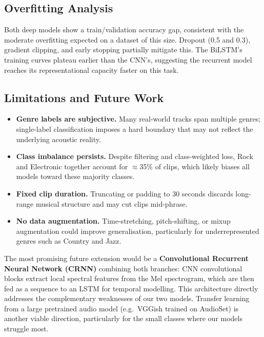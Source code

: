 \documentclass[12pt, a4paper]{article}
\begin{document}
\subsection{Overfitting Analysis}

Both deep models show a train/validation accuracy gap, consistent with the
moderate overfitting expected on a dataset of this size. Dropout (0.5 and 0.3),
gradient clipping, and early stopping partially mitigate this. The BiLSTM's
training curves plateau earlier than the CNN's, suggesting the recurrent model
reaches its representational capacity faster on this task.

\subsection{Limitations and Future Work}

\begin{itemize}[noitemsep, topsep=4pt]
    \item \textbf{Genre labels are subjective.} Many real-world tracks span multiple
          genres; single-label classification imposes a hard boundary that may not
          reflect the underlying acoustic reality.
    \item \textbf{Class imbalance persists.} Despite filtering and class-weighted loss,
          Rock and Electronic together account for $\approx$35\% of clips, which likely
          biases all models toward these majority classes.
    \item \textbf{Fixed clip duration.} Truncating or padding to 30 seconds discards
          long-range musical structure and may cut clips mid-phrase.
    \item \textbf{No data augmentation.} Time-stretching, pitch-shifting, or mixup
          augmentation could improve generalisation, particularly for underrepresented
          genres such as Country and Jazz.
\end{itemize}

The most promising future extension would be a \textbf{Convolutional Recurrent Neural
Network (CRNN)} \citep{choi2017crnn} combining both branches: CNN convolutional blocks
extract local spectral features from the Mel spectrogram, which are then fed as a
sequence to an LSTM for temporal modelling. This architecture directly addresses the
complementary weaknesses of our two models. Transfer learning from a large pretrained
audio model (e.g.\ VGGish trained on AudioSet) is another viable direction, particularly
for the small classes where our models struggle most.
\end{document}
